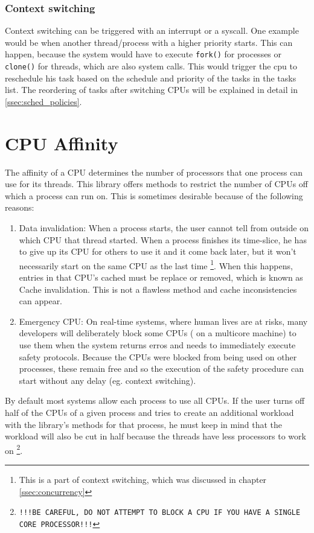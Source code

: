 \subsubsection{Context switching}
Context switching can be triggered with an interrupt or a syscall. One example would be when another thread/process with a higher priority starts. This can happen, because the system would have to execute \texttt{fork()} for processes or \texttt{clone()} for threads, which are also system calls. This would trigger the cpu
to reschedule his task based on the schedule and priority of the tasks in the tasks list\cite{clone}.
The reordering of tasks after switching CPUs will be explained in detail in \ref{ssec:sched_policies}.\\ 

\section{CPU Affinity}
\label{ssec:cpu_affinity}
The affinity of a CPU determines the number of processors that one process can use for its threads.
This library offers methods to restrict the number of CPUs off which a process can run on. This is
sometimes desirable because of the following reasons:
\begin{enumerate}
	\item Data invalidation: When a process starts, the user cannot tell from outside on which CPU
	that thread started. When a process finishes its time-slice, he has to give up its CPU for
	others to use it and it come back later, but it won't necessarily start on the same CPU as the
	last time \footnote{This is a part of context switching, which was discussed in chapter \ref{ssec:concurrency}}. When this happens, entries in that CPU's cached must be replace or removed,
	which is known as \dq Cache invalidation\dq{}. This is not a flawless method and cache inconsistencies
	can appear.
	\item Emergency CPU: On real-time systems, where human lives are at risks, many developers will
	deliberately block some CPUs ( on a multicore machine) to use them when the system returns
	erros and needs to immediately execute safety protocols. Because the CPUs were blocked
	from being used on other processes, these remain free and so the execution of the safety procedure can start without any delay (eg. context switching).
	
\end{enumerate}

By default most systems allow each process to use all CPUs. If the user turns off half of the
CPUs of a given process and tries to create an additional workload with the library's methods for that process, he must keep in
mind that the workload will also be cut in half because the threads have less processors to work on
\footnote{\texttt{!!!BE CAREFUL, DO NOT ATTEMPT TO BLOCK A CPU IF YOU HAVE A SINGLE CORE PROCESSOR!!!}}.
